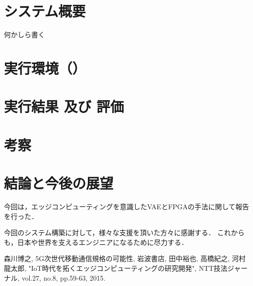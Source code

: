 \documentclass[paper]{ieicej}
\begin{document}
\section{システム概要}
何かしら書く

\section{実行環境（）}

\section{実行結果 及び 評価}

\section{考察}

\section{結論と今後の展望}
今回は，エッジコンピューティングを意識したVAEとFPGAの手法に関して報告を行った．

\ack
今回のシステム構築に対して，様々な支援を頂いた方々に感謝する．
これからも，日本や世界を支えるエンジニアになるために尽力する．
%
%
\begin{thebibliography}{99}%
森川博之, 5G次世代移動通信規格の可能性, 岩波書店, 
田中裕也, 高橋紀之, 河村龍太郎, "IoT時代を拓くエッジコンピューティングの研究開発", NTT技法ジャーナル, vol.27, no.8, pp.59-63, 2015.
\end{thebibliography}
\end{document}
